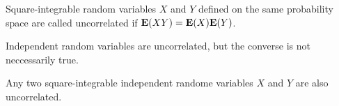 \begin{definition*} 
Square-integrable random variables $X$ and $Y$ defined on the same probability
space are called uncorrelated if $\mathbf{E}(XY) = \mathbf{E}(X) \mathbf{E}(Y)$.
\end{definition*} 

\begin{remark*} 
Independent random variables are uncorrelated, but the converse is not
neccessarily true.
\end{remark*} 

\begin{proposition*} 
Any two square-integrable independent randome variables $X$ and $Y$ are also
uncorrelated.
\end{proposition*} 







